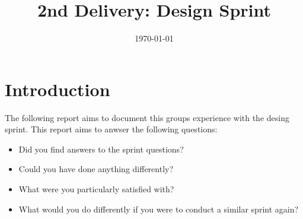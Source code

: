 \documentclass[12pt]{article}
\title{2nd Delivery: Design Sprint}
\date{\today}
\begin{document}
\subsectionfont{\fontsize{12}{14}\selectfont}

\maketitle

\tableofcontents

\section{Introduction}
The following report aims to document this groups experience with the desing sprint\cite{DesignSprint2024}.
This report aims to anwser the following questions:
\begin{itemize}
    \item Did you find answers to the sprint questions?
    \item Could you have done anything differently?
    \item What were you particularly satisfied with?
    \item What would you do differently if you were to conduct a similar sprint again?
\end{itemize}


\printbibliography
\end{document}
